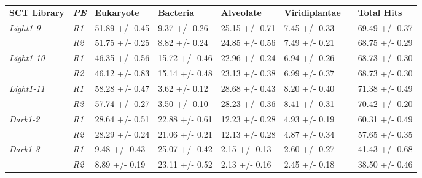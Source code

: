 \begin{table}[h]
     \begin{tabular}{@{}|l|l|l|l|l|l|l|l|@{}}
         \cmidrule(r){1-6} \cmidrule(l){8-8}
         \textbf{SCT Library} & \textit{\textbf{PE}} & \textbf{Eukaryote} & \textbf{Bacteria} & \textbf{Alveolate} & \textbf{Viridiplantae} &  & \textbf{Total Hits} \\ \cmidrule(r){1-6} \cmidrule(l){8-8} 
         \textit{Light1-9}    & \textit{R1}          & 51.89 +/- 0.45     & 9.37 +/- 0.26     & 25.15 +/-  0.71    & 7.45 +/- 0.33          &  & 69.49 +/- 0.37      \\ \cmidrule(lr){2-2}
                              & \textit{R2}          & 51.75 +/- 0.25     & 8.82 +/- 0.24     & 24.85 +/- 0.56     & 7.49 +/- 0.21          &  & 68.75 +/- 0.29      \\ \cmidrule(r){1-6} \cmidrule(l){8-8} 
         \textit{Light1-10}   & \textit{R1}          & 46.35 +/- 0.56     & 15.72 +/- 0.46    & 22.96 +/- 0.24     & 6.94 +/- 0.26          &  & 68.73 +/- 0.30      \\ \cmidrule(lr){2-2}
                              & \textit{R2}          & 46.12 +/- 0.83     & 15.14 +/- 0.48    & 23.13 +/- 0.38     & 6.99 +/- 0.37          &  & 68.73 +/- 0.30      \\ \cmidrule(r){1-6} \cmidrule(l){8-8} 
         \textit{Light1-11}   & \textit{R1}          & 58.28 +/- 0.47     & 3.62 +/- 0.12     & 28.68 +/- 0.43     & 8.20 +/- 0.40          &  & 71.38 +/- 0.49      \\ \cmidrule(lr){2-2}
                              & \textit{R2}          & 57.74 +/- 0.27     & 3.50 +/- 0.10     & 28.23 +/- 0.36     & 8.41 +/- 0.31          &  & 70.42 +/- 0.20      \\ \cmidrule(r){1-6} \cmidrule(l){8-8} 
         \textit{Dark1-2}     & \textit{R1}          & 28.64 +/- 0.51     & 22.88 +/- 0.61    & 12.23 +/- 0.28     & 4.93 +/- 0.19          &  & 60.31 +/- 0.49      \\ \cmidrule(lr){2-2}
                              & \textit{R2}          & 28.29 +/- 0.24     & 21.06 +/- 0.21    & 12.13 +/- 0.28     & 4.87 +/- 0.34          &  & 57.65 +/- 0.35      \\ \cmidrule(r){1-6} \cmidrule(l){8-8} 
         \textit{Dark1-3}     & \textit{R1}          & 9.48 +/- 0.43      & 25.07 +/- 0.42    & 2.15 +/- 0.13      & 2.60 +/- 0.27          &  & 41.43 +/- 0.68      \\ \cmidrule(lr){2-2}
                              & \textit{R2}          & 8.89 +/- 0.19      & 23.11 +/- 0.52    & 2.13 +/- 0.16      & 2.45 +/- 0.18          &  & 38.50 +/- 0.46      \\ \cmidrule(r){1-6} \cmidrule(l){8-8} 

\end{tabular}
\end{table}

